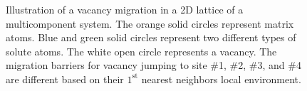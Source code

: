 \begingroup
\begin{figure}[!ht]
  \centering
\caption[Illustration of a vacancy migration in a 2D lattice of a multicomponent system.]{Illustration of a vacancy migration in a 2D lattice of a multicomponent system. The orange solid circles represent matrix atoms. Blue and green solid circles represent two different types of solute atoms. The white open circle represents a vacancy. The migration barriers for vacancy jumping to site \#1, \#2, \#3, and \#4 are different based on their $1^\text{st}$ nearest neighbors local environment.}
  \label{Chap:Al/Vac:barrier}
\end{figure}
\endgroup

